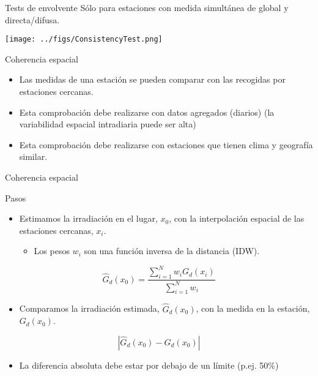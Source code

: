 \documentclass[aspectratio=169, usenames,svgnames,dvipsnames]{beamer}
\begin{document}
\begin{frame}[label={sec:orgbc550ab}]{Tests de envolvente}
Sólo para estaciones con medida simultánea de global y directa/difusa.
\begin{center}
\texttt{[image: ../figs/ConsistencyTest.png]}
\end{center}

\nocite{Younes.Claywell.ea2005}
\end{frame}

\begin{frame}[label={sec:orgd72d439}]{Coherencia espacial}
\begin{itemize}
\item Las medidas de una estación se pueden comparar con las recogidas por estaciones cercanas.
\item Esta comprobación debe realizarse con \alert{datos agregados} (diarios) (la variabilidad espacial intradiaria puede ser alta)
\item Esta comprobación debe realizarse con estaciones que tienen \alert{clima y geografía similar}.
\end{itemize}

\nocite{Journee.Bertrand2011}
\end{frame}

\begin{frame}[label={sec:org4fbcb96}]{Coherencia espacial}
\begin{block}{Pasos}
\begin{itemize}
\item Estimamos la irradiación en el lugar, \(x_0\), con la interpolación espacial de las estaciones cercanas, \(x_i\).
\begin{itemize}
\item Los pesos \(w_i\) son una función inversa de la distancia (IDW).
\end{itemize}
\end{itemize}
\[
\widehat{G}_d(x_0) = \frac{\sum_{i=1}^N w_i G_{d}(x_i)}{\sum_{i=1}^N w_i} 
\]
\begin{itemize}
\item Comparamos la irradiación estimada, \(\widehat{G}_d(x_0)\), con la medida en la estación, \(G_d(x_0)\).
\end{itemize}
\[
\left| \widehat{G}_d(x_0) - G_d(x_0) \right|
\]
\begin{itemize}
\item La diferencia absoluta debe estar por debajo de un límite (p.ej. 50\%)
\end{itemize}
\end{block}
\end{frame}
\end{document}
